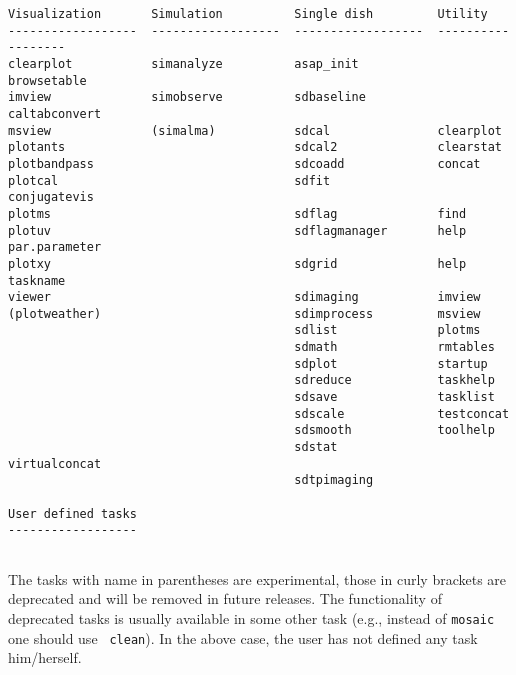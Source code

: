 \begin{verbatim}
Visualization       Simulation          Single dish         Utility           
------------------  ------------------  ------------------  ------------------
clearplot           simanalyze          asap_init           browsetable       
imview              simobserve          sdbaseline          caltabconvert     
msview              (simalma)           sdcal               clearplot         
plotants                                sdcal2              clearstat         
plotbandpass                            sdcoadd             concat            
plotcal                                 sdfit               conjugatevis      
plotms                                  sdflag              find              
plotuv                                  sdflagmanager       help par.parameter
plotxy                                  sdgrid              help taskname     
viewer                                  sdimaging           imview            
(plotweather)                           sdimprocess         msview            
                                        sdlist              plotms            
                                        sdmath              rmtables          
                                        sdplot              startup           
                                        sdreduce            taskhelp          
                                        sdsave              tasklist          
                                        sdscale             testconcat        
                                        sdsmooth            toolhelp          
                                        sdstat              virtualconcat     
                                        sdtpimaging                           

User defined tasks
------------------


\end{verbatim}
\normalsize The tasks with name in parentheses are experimental, those
in curly brackets are deprecated and will be removed in future
releases. The functionality of deprecated tasks is usually available
in some other task (e.g., instead of {\tt mosaic} one should use {\tt
  clean}). In the above case, the user has not defined any task
him/herself.

